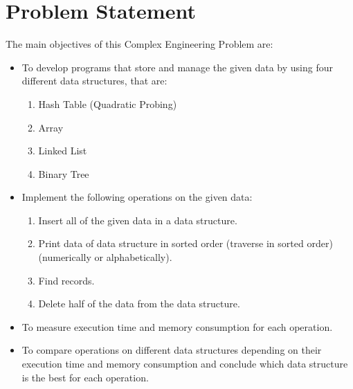 
\chapter{Problem Statement} %
\label{Chapter1}
The main objectives of this Complex Engineering Problem are:
\begin{itemize}
	\item To develop programs that store and manage the given data by using four different data structures, that are:
		\begin{enumerate}
			\item Hash Table (Quadratic Probing)
			\item Array
			\item Linked List
			\item Binary Tree
		\end{enumerate}
	\item Implement the following operations on the given data:
		\begin{enumerate}
			\item Insert all of the given data in a data structure.
			\item Print data of data structure in sorted order (traverse in sorted order) (numerically or alphabetically).
			\item Find records.
			\item Delete half of the data from the data structure.			
		\end{enumerate}
	\item To measure execution time and memory consumption for each operation.
	\item To compare operations on different data structures depending on their execution time and memory consumption and conclude 
	which data structure is the best for each operation.
\end{itemize}


